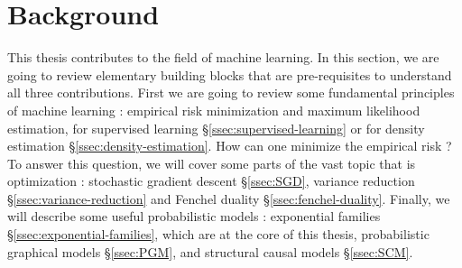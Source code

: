 \setcounter{theorem}{0}

\newcommand*{\ptrue}{\ensuremath{\bm{p}}}
\newcommand*{\pmodel}{\ensuremath{\bm{p}_{\theta}}}
\newcommand*{\lr}{\gamma}
\newcommand*{\loss}{\ell}


\chapter{Background}

This thesis contributes to the field of machine learning.
In this section, we are going to review elementary building blocks that are pre-requisites to understand all three contributions.
First we are going to review some fundamental principles of machine learning : empirical risk minimization and maximum likelihood estimation, for supervised learning \S\ref{ssec:supervised-learning} or for density estimation \S\ref{ssec:density-estimation}.
How can one minimize the empirical risk ?  
To answer this question, we will cover some parts of the vast topic that is optimization : stochastic gradient descent \S\ref{ssec:SGD}, variance reduction \S\ref{ssec:variance-reduction} and Fenchel duality \S\ref{ssec:fenchel-duality}.
Finally, we will describe some useful probabilistic models : exponential families \S\ref{ssec:exponential-families}, which are at the core of this thesis, probabilistic graphical models \S\ref{ssec:PGM}, and  structural causal models \S\ref{ssec:SCM}.



